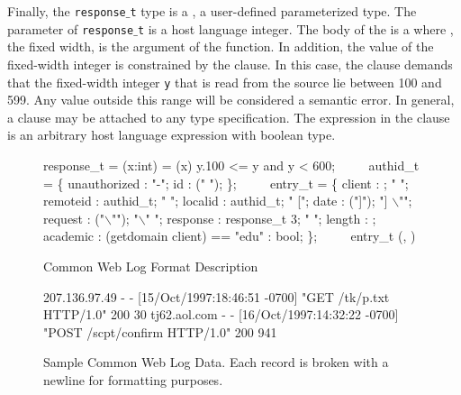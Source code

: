 Finally, the {\tt response$\_$t} type is a \Pfun, a user-defined
parameterized type.  The parameter of {\tt response$\_$t} is a host
language integer.  The body of the \Pfun{} is a 
where , the fixed width, is the argument of the function.  In
addition, the value of the fixed-width integer is constrained by the
\Pwhere{} clause.  In this case, the \Pwhere{} clause demands that
the fixed-width integer {\tt y} that is read from the source lie 
between 100 and 599.
Any value outside this range will be considered a semantic error.
In general, a \Pwhere{} clause may be attached to 
any type specification.  The expression in the \Pwhere{} clause
is an arbitrary host language expression with boolean type.


\begin{figure}
{\small
\begin{code}
response\_t =
  \Pfun(x:int) =
    (x) \Pwhere{} y.100 <= y and y < 600;
\(\qquad\)
authid\_t = \Punion{} \{
  unauthorized : "-";
  id           : \Pstring (" ");
\};
\(\qquad\)
entry\_t = \Pstruct{} \{
  client   : \Pip{};             " ";
  remoteid : authid\_t;        " ";
  localid  : authid\_t;        " [";
  date     : \Pdate("]");      "] \(\backslash\)"";
  request  : \Pstring("\(\backslash\)"");   "\(\backslash\)" ";
  response : response\_t 3;    " "; 
  length   : \Puint{};
  academic : \Pcompute 
              (getdomain client) == "edu" : bool;
\};
\(\qquad\)
entry\_t \Parray{}(\Peor, \Peof)
\end{code}

\caption{\ipads{} Common Web Log Format Description}
\label{fig:ipads-clf}
}
\end{figure}

\begin{figure}
{\small
\begin{code}
{}207.136.97.49 - - [15/Oct/1997:18:46:51 -0700] 
"GET /tk/p.txt HTTP/1.0" 200 30
tj62.aol.com - - [16/Oct/1997:14:32:22 -0700] 
"POST /scpt/confirm HTTP/1.0" 200 941
\end{code}
\caption{Sample Common Web Log Data. Each record is broken with a
  newline for formatting purposes.}
\label{fig:ipads-clf-data}
}
\end{figure}

